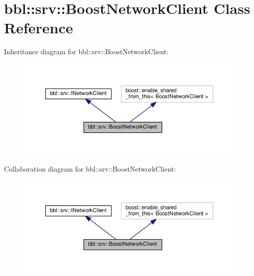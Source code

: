 \hypertarget{classbbl_1_1srv_1_1_boost_network_client}{}\section{bbl\+:\+:srv\+:\+:Boost\+Network\+Client Class Reference}
\label{classbbl_1_1srv_1_1_boost_network_client}


Inheritance diagram for bbl\+:\+:srv\+:\+:Boost\+Network\+Client\+:
\nopagebreak
\begin{figure}[H]
\begin{center}
\leavevmode
\includegraphics[width=350pt]{classbbl_1_1srv_1_1_boost_network_client__inherit__graph}
\end{center}
\end{figure}


Collaboration diagram for bbl\+:\+:srv\+:\+:Boost\+Network\+Client\+:
\nopagebreak
\begin{figure}[H]
\begin{center}
\leavevmode
\includegraphics[width=350pt]{classbbl_1_1srv_1_1_boost_network_client__coll__graph}
\end{center}
\end{figure}
